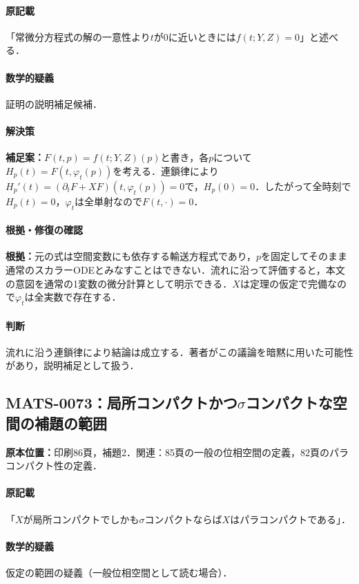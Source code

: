 \documentclass[a4paper,10pt]{ltjsarticle}
\begin{document}
\paragraph{原記載}「常微分方程式の解の一意性より$t$が0に近いときには$f(t;Y,Z)=0$」と述べる．

\paragraph{数学的疑義}証明の説明補足候補．

\paragraph{解決策}\textbf{補足案：}$F(t,p)=f(t;Y,Z)(p)$と書き，各$p$について$H_p(t)=F(t,\varphi_t(p))$を考える．連鎖律により$H_p'(t)=(\partial_tF+XF)(t,\varphi_t(p))=0$で，$H_p(0)=0$．したがって全時刻で$H_p(t)=0$，$\varphi_t$は全単射なので$F(t,\cdot)=0$．

\paragraph{根拠・修復の確認}\textbf{根拠：}元の式は空間変数にも依存する輸送方程式であり，$p$を固定してそのまま通常のスカラーODEとみなすことはできない．流れに沿って評価すると，本文の意図を通常の1変数の微分計算として明示できる．$X$は定理の仮定で完備なので$\varphi_t$は全実数で存在する．

\paragraph{判断}流れに沿う連鎖律により結論は成立する．著者がこの議論を暗黙に用いた可能性があり，説明補足として扱う．


\subsection*{MATS-0073：局所コンパクトかつ$\sigma$コンパクトな空間の補題の範囲}\label{math:MATS-0073}
\noindent\textbf{原本位置：}印刷86頁，補題2．関連：85頁の一般の位相空間の定義，82頁のパラコンパクト性の定義．

\paragraph{原記載}「$X$が局所コンパクトでしかも$\sigma$コンパクトならば$X$はパラコンパクトである」．

\paragraph{数学的疑義}仮定の範囲の疑義（一般位相空間として読む場合）．
\end{document}
